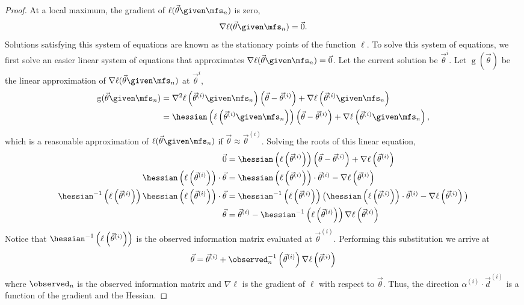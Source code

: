 \begin{proof}
At a local maximum, the gradient of $\ell(\vec\theta \given \mfs_n)$ is zero,
\begin{equation*}
\nabla \ell(\vec\theta \given \mfs_n) = \vec{0}.
\end{equation*}
Solutions satisfying this system of equations are known as the stationary points of the function $\ell$. To solve this system of equations, we first solve an easier linear system of equations that approximates $\nabla \ell(\vec\theta \given \mfs_n) = \vec{0}$. 
Let the current solution be $\vec\theta^{i}$. Let $\operatorname{g}(\vec\theta)$ be the linear approximation of $\nabla \ell(\vec\theta \given \mfs_n)$ at $\vec\theta^{i}$,
\begin{align*}
    \operatorname{g}(\vec\theta \given \mfs_n)
        &= \nabla^2 \ell \left(\vec\theta^{(i)} \given \mfs_n \right)\left(\vec\theta - \vec\theta^{(i)} \right) + \nabla \ell \left(\vec\theta^{(i)} \given \mfs_n \right)\\
        &= \hessian \left ( \ell \left(\vec\theta^{(i)} \given \mfs_n \right) \right ) \left(\vec\theta - \vec\theta^{(i)} \right) + \nabla \ell \left(\vec\theta^{(i)} \given \mfs_n \right),
\end{align*}
which is a reasonable approximation of $\ell(\vec\theta \given \mfs_n)$ if $\vec\theta \approx \vec\theta^{(i)}$. Solving the roots of this linear equation,
\begin{align*}
    \vec{0} &= \hessian \left(\ell \left(\vec\theta^{(i)}\right)\right) \left(\vec\theta - \vec\theta^{(i)} \right) + \nabla \ell \left(\vec\theta^{(i)}\right)\\
    \hessian \left ( \ell \left(\vec\theta^{(i)}\right) \right ) \cdot \vec\theta &= \hessian \left ( \ell \left(\vec\theta^{(i)}\right) \right ) \cdot \vec\theta^{(i)} - \nabla \ell \left(\vec\theta^{(i)}\right)\\
    \hessian^{-1}\left ( \ell \left(\vec\theta^{(i)}\right) \right ) \hessian \left ( \ell \left(\vec\theta^{(i)}\right) \right ) \cdot \vec\theta &= \hessian^{-1} \left( \ell \left(\vec\theta^{(i)}\right) \right ) \big ( \hessian \left ( \ell \left(\vec\theta^{(i)}\right) \right ) \cdot \vec\theta^{(i)} - \nabla \ell \left(\vec\theta^{(i)}\right) \big )\\
    \vec\theta &= \vec\theta^{(i)} - \hessian^{-1} \left( \ell \left(\vec\theta^{(i)}\right) \right ) \nabla \ell \left(\vec\theta^{(i)}\right)
\end{align*}
Notice that $\hessian^{-1} \left( \ell \left(\vec\theta^{(i)}\right) \right )$ is the observed information matrix evaluated at $\vec\theta^{(i)}$. Performing this substitution we arrive at
\begin{equation*}
    \vec\theta = \vec\theta^{(i)} + \observed^{-1}_n \left(\vec\theta^{(i)}\right ) \nabla \ell \left(\vec\theta^{(i)}\right)
\end{equation*}
where $\observed_n$ is the observed information matrix and $\nabla \ell$ is the gradient of $\ell$ with respect to $\vec\theta$. Thus, the direction $\alpha^{(i)} \cdot \vec{d}^{(i)}$ is a function of the gradient and the Hessian.
\end{proof}